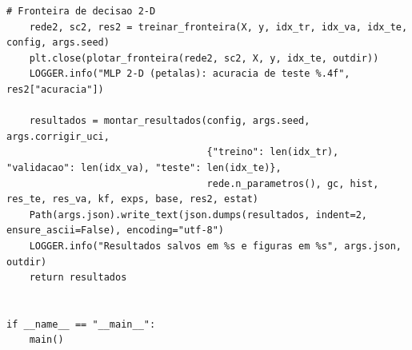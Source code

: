 \documentclass[12pt,a4paper]{article}
\begin{document}
{\begin{lstlisting}[caption={Programa completo \texttt{iris\_mlp.py}.},label={lst:iris_mlp}]
    # Fronteira de decisao 2-D
    rede2, sc2, res2 = treinar_fronteira(X, y, idx_tr, idx_va, idx_te, config, args.seed)
    plt.close(plotar_fronteira(rede2, sc2, X, y, idx_te, outdir))
    LOGGER.info("MLP 2-D (petalas): acuracia de teste %.4f", res2["acuracia"])

    resultados = montar_resultados(config, args.seed, args.corrigir_uci,
                                   {"treino": len(idx_tr), "validacao": len(idx_va), "teste": len(idx_te)},
                                   rede.n_parametros(), gc, hist, res_te, res_va, kf, exps, base, res2, estat)
    Path(args.json).write_text(json.dumps(resultados, indent=2, ensure_ascii=False), encoding="utf-8")
    LOGGER.info("Resultados salvos em %s e figuras em %s", args.json, outdir)
    return resultados


if __name__ == "__main__":
    main()
\end{lstlisting}
}
\end{document}
